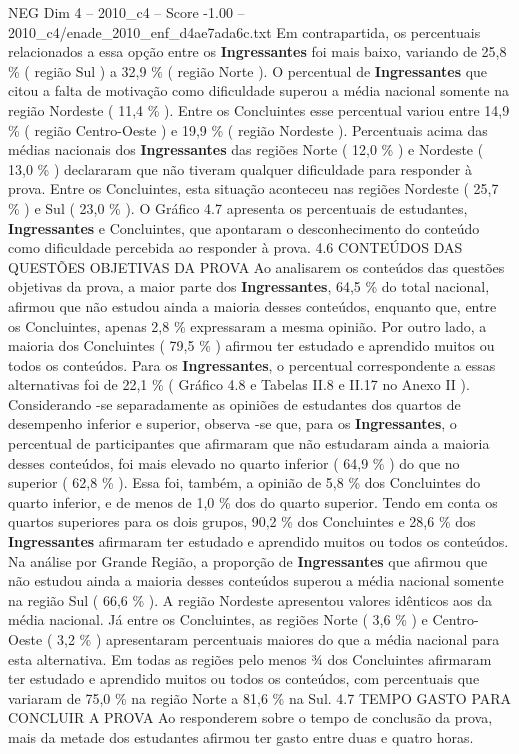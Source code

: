 \begin{textsample}{NEG Dim 4 – 2010\_c4 – Score -1.00 – 2010\_c4/enade\_2010\_enf\_d4ae7ada6c.txt}
Em contrapartida, os percentuais relacionados a essa opção entre os \textbf{Ingressantes} foi mais baixo, variando de 25,8 \% ( região Sul ) a 32,9 \% ( região Norte ).
O percentual de \textbf{Ingressantes} que citou a falta de motivação como dificuldade superou a média nacional somente na região Nordeste ( 11,4 \% ).
Entre os Concluintes esse percentual variou entre 14,9 \% ( região Centro-Oeste ) e 19,9 \% ( região Nordeste ).
Percentuais acima das médias nacionais dos \textbf{Ingressantes} das regiões Norte ( 12,0 \% ) e Nordeste ( 13,0 \% ) declararam que não tiveram qualquer dificuldade para responder à prova.
Entre os Concluintes, esta situação aconteceu nas regiões Nordeste ( 25,7 \% ) e Sul ( 23,0 \% ).
O Gráfico 4.7 apresenta os percentuais de estudantes, \textbf{Ingressantes} e Concluintes, que apontaram o desconhecimento do conteúdo como dificuldade percebida ao responder à prova. 4.6 CONTEÚDOS DAS QUESTÕES OBJETIVAS DA PROVA Ao analisarem os conteúdos das questões objetivas da prova, a maior parte dos \textbf{Ingressantes}, 64,5 \% do total nacional, afirmou que não estudou ainda a maioria desses conteúdos, enquanto que, entre os Concluintes, apenas 2,8 \% expressaram a mesma opinião.
Por outro lado, a maioria dos Concluintes ( 79,5 \% ) afirmou ter estudado e aprendido muitos ou todos os conteúdos.
Para os \textbf{Ingressantes}, o percentual correspondente a essas alternativas foi de 22,1 \% ( Gráfico 4.8 e Tabelas II.8 e II.17 no Anexo II ).
Considerando -se separadamente as opiniões de estudantes dos quartos de desempenho inferior e superior, observa -se que, para os \textbf{Ingressantes}, o percentual de participantes que afirmaram que não estudaram ainda a maioria desses conteúdos, foi mais elevado no quarto inferior ( 64,9 \% ) do que no superior ( 62,8 \% ).
Essa foi, também, a opinião de 5,8 \% dos Concluintes do quarto inferior, e de menos de 1,0 \% dos do quarto superior.
Tendo em conta os quartos superiores para os dois grupos, 90,2 \% dos Concluintes e 28,6 \% dos \textbf{Ingressantes} afirmaram ter estudado e aprendido muitos ou todos os conteúdos.
Na análise por Grande Região, a proporção de \textbf{Ingressantes} que afirmou que não estudou ainda a maioria desses conteúdos superou a média nacional somente na região Sul ( 66,6 \% ).
A região Nordeste apresentou valores idênticos aos da média nacional.
Já entre os Concluintes, as regiões Norte ( 3,6 \% ) e Centro-Oeste ( 3,2 \% ) apresentaram percentuais maiores do que a média nacional para esta alternativa.
Em todas as regiões pelo menos ¾ dos Concluintes afirmaram ter estudado e aprendido muitos ou todos os conteúdos, com percentuais que variaram de 75,0 \% na região Norte a 81,6 \% na Sul. 4.7 TEMPO GASTO PARA CONCLUIR A PROVA Ao responderem sobre o tempo de conclusão da prova, mais da metade dos estudantes afirmou ter gasto entre duas e quatro horas.

\end{textsample}
